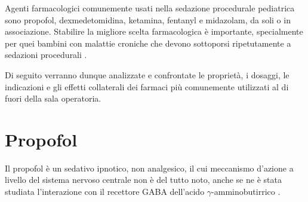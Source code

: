 Agenti farmacologici comunemente usati nella sedazione procedurale pediatrica sono propofol, dexmedetomidina, ketamina, fentanyl e midazolam, da soli o in associazione. Stabilire la migliore scelta farmacologica è importante, specialmente per quei bambini con malattie croniche che devono sottoporsi ripetutamente a sedazioni procedurali .

Di seguito verranno dunque analizzate e confrontate le proprietà, i dosaggi, le indicazioni e gli effetti collaterali dei farmaci più comunemente utilizzati al di fuori della sala operatoria. 





\section{Propofol}

Il propofol è un sedativo ipnotico, non analgesico, il cui meccanismo d'azione a livello del sistema nervoso centrale non è del tutto noto, anche se ne è stata studiata l'interazione con il recettore GABA dell'acido $\gamma$-amminobutirrico \cite{Propofol2015}.

